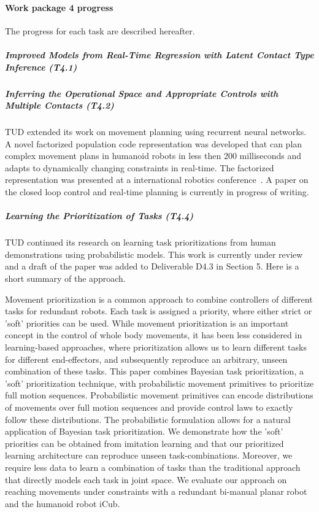 

\paragraph{Work package 4 progress}

The progress for each task are described hereafter.

\subparagraph*{Improved Models from Real-Time Regression with Latent Contact Type Inference (T4.1)}



\subparagraph*{Inferring the Operational Space and Appropriate Controls with Multiple Contacts (T4.2)}



TUD extended its work on movement planning using recurrent neural networks. A novel factorized population code representation was developed that can plan complex movement plans in humanoid robots in less then 200 milliseconds and adapts to dynamically changing constraints in real-time. The factorized representation was presented at a international robotics conference~\cite{tanneberg2016deep}. A paper on the closed loop control and real-time planning is currently in progress of writing. 

\subparagraph{Learning the Prioritization of Tasks (T4.4)}

TUD continued its research on learning task prioritizations from human demonstrations using probabilistic models. This work is currently under review and 
a draft of the paper was added to Deliverable D4.3 in Section 5.  Here is a short summary of the approach. 

Movement prioritization is a common approach
to combine controllers of different tasks for redundant robots.
Each task is assigned a priority, where either strict or 'soft'
priorities can be used. While movement prioritization is an
important concept in the control of whole body movements, it
has been less considered in learning-based approaches, where
prioritization allows us to learn different tasks for different
end-effectors, and subsequently reproduce an arbitrary, unseen
combination of these tasks. This paper combines Bayesian task
prioritization, a 'soft' prioritization technique, with probabilistic
movement primitives to prioritize full motion sequences.
Probabilistic movement primitives can encode distributions of
movements over full motion sequences and provide control
laws to exactly follow these distributions. The probabilistic
formulation allows for a natural application of Bayesian task
prioritization. We demonstrate how the 'soft' priorities can
be obtained from imitation learning and that our prioritized
learning architecture can reproduce unseen task-combinations.
Moreover, we require less data to learn a combination of tasks
than the traditional approach that directly models each task in
joint space. We evaluate our approach on reaching movements
under constraints with a redundant bi-manual planar robot
and the humanoid robot iCub. 


